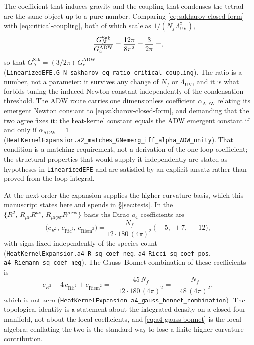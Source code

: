\documentclass[aps,prd,nofootinbib,superscriptaddress,12pt]{revtex4-2}
\DeclareRobustCommand{\lb}{\discretionary{}{}{}}
\begin{document}
The coefficient that induces gravity and the coupling that condenses the
tetrad are the same object up to a pure number. Comparing
\eqref{eq:sakharov-closed-form} with \eqref{eq:critical-coupling}, both of
which scale as $1/(N_f\Lambda_{\mathrm{UV}}^{2})$,
\begin{equation}
\label{eq:sakharov-tie}
\frac{G_N^{\mathrm{Sak}}}{G_c^{\mathrm{ADW}}}
= \frac{12\pi}{8\pi^{2}} = \frac{3}{2\pi}
= \unskip ,
\end{equation}
so that $G_N^{\mathrm{Sak}} = (3/2\pi)\,G_c^{\mathrm{ADW}}$
(\texttt{Linearized\lb{}EFE.\lb{}G\_\lb{}N\_\lb{}sakharov\_\lb{}eq\_\lb{}ratio\_\lb{}critical\_\lb{}coupling}).
The ratio is a number, not a parameter: it survives any change of $N_f$ or
$\Lambda_{\mathrm{UV}}$, and it is what forbids tuning the induced Newton
constant independently of the condensation threshold. The ADW route carries
one dimensionless coefficient $\alpha_{\mathrm{ADW}}$ relating its emergent
Newton constant to \eqref{eq:sakharov-closed-form}, and demanding that the
two agree fixes it: the heat-kernel constant equals the ADW emergent
constant if and only if $\alpha_{\mathrm{ADW}} = 1$
(\texttt{Heat\lb{}Kernel\lb{}Expansion.\lb{}a2\_\lb{}matches\_\lb{}GNemerg\_\lb{}iff\_\lb{}alpha\_\lb{}ADW\_\lb{}unity}).
That condition is a matching requirement, not a derivation of the one-loop
coefficient; the structural properties that would supply it independently
are stated as hypotheses in \texttt{Linearized\lb{}EFE} and are satisfied by an
explicit ansatz rather than proved from the loop integral.

At the next order the expansion supplies the higher-curvature basis, which
this manuscript states here and spends in \S\ref{sec:tests}. In the
$\{R^{2},\,R_{\mu\nu}R^{\mu\nu},\,R_{\mu\nu\rho\sigma}R^{\mu\nu\rho\sigma}\}$
basis the Dirac $a_{4}$ coefficients are
\begin{equation}
\label{eq:a4-basis}
\bigl(c_{R^{2}},\,c_{\mathrm{Ric}^{2}},\,c_{\mathrm{Riem}^{2}}\bigr)
= \frac{N_f}{12\cdot 180\,(4\pi)^{2}}\,\bigl(-5,\;+7,\;-12\bigr),
\end{equation}
with signs fixed independently of the species count
(\texttt{Heat\lb{}Kernel\lb{}Expansion.\lb{}a4\_\lb{}R\_\lb{}sq\_\lb{}coef\_\lb{}neg},
\texttt{a4\_\lb{}Ricci\_\lb{}sq\_\lb{}coef\_\lb{}pos}, \texttt{a4\_\lb{}Riemann\_\lb{}sq\_\lb{}coef\_\lb{}neg}).
The Gauss--Bonnet combination of these coefficients is
\begin{equation}
\label{eq:a4-gauss-bonnet}
c_{R^{2}} - 4\,c_{\mathrm{Ric}^{2}} + c_{\mathrm{Riem}^{2}}
= -\,\frac{45\,N_f}{12\cdot 180\,(4\pi)^{2}}
= -\,\frac{N_f}{48\,(4\pi)^{2}},
\end{equation}
which is not zero
(\texttt{Heat\lb{}Kernel\lb{}Expansion.\lb{}a4\_\lb{}gauss\_\lb{}bonnet\_\lb{}combination}). The
topological identity is a statement about the integrated density on a
closed four-manifold, not about the local coefficients, and
\eqref{eq:a4-gauss-bonnet} is the local algebra; conflating the two is the
standard way to lose a finite higher-curvature contribution.
\end{document}

